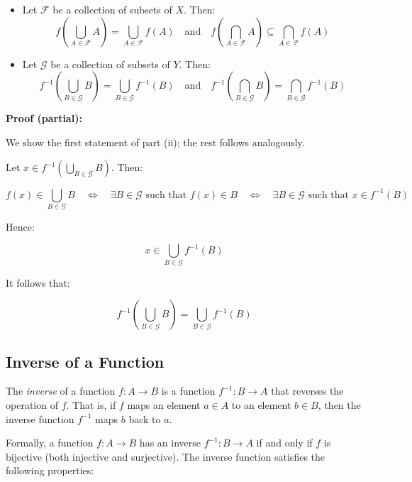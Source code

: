 \begin{itemize}
	\item Let \( \mathcal{F} \) be a collection of subsets of \( X \). Then:
	      \[
		      f\left( \bigcup_{A \in \mathcal{F}} A \right) = \bigcup_{A \in \mathcal{F}} f(A)
		      \quad \text{and} \quad
		      f\left( \bigcap_{A \in \mathcal{F}} A \right) \subseteq \bigcap_{A \in \mathcal{F}} f(A)
	      \]

	\item Let \( \mathcal{G} \) be a collection of subsets of \( Y \). Then:
	      \[
		      f^{-1}\left( \bigcup_{B \in \mathcal{G}} B \right) = \bigcup_{B \in \mathcal{G}} f^{-1}(B)
		      \quad \text{and} \quad
		      f^{-1}\left( \bigcap_{B \in \mathcal{G}} B \right) = \bigcap_{B \in \mathcal{G}} f^{-1}(B)
	      \]
\end{itemize}

\textbf{Proof (partial):}

We show the first statement of part (ii); the rest follows analogously.

Let \( x \in f^{-1} \left( \bigcup_{B \in \mathcal{G}} B \right) \). Then:

\[
	f(x) \in \bigcup_{B \in \mathcal{G}} B
	\quad \Leftrightarrow \quad
	\exists B \in \mathcal{G} \text{ such that } f(x) \in B
	\quad \Leftrightarrow \quad
	\exists B \in \mathcal{G} \text{ such that } x \in f^{-1}(B)
\]

Hence:

\[
	x \in \bigcup_{B \in \mathcal{G}} f^{-1}(B)
\]

It follows that:

\[
	f^{-1} \left( \bigcup_{B \in \mathcal{G}} B \right) = \bigcup_{B \in \mathcal{G}} f^{-1}(B)
\]

\QED

\subsection{Inverse of a Function}

The \emph{inverse} of a function \(f: A \to B\) is a function \(f^{-1}: B \to A\) that 
reverses the operation of \(f\). That is, if \(f\) maps an element \(a \in A\) to an 
element \(b \in B\), then the inverse function \(f^{-1}\) maps \(b\) back to \(a\).

Formally, a function \(f: A \to B\) has an inverse \(f^{-1}: B \to A\)  
if and only if \(f\) is bijective (both injective and surjective). The inverse function satisfies the following properties:

